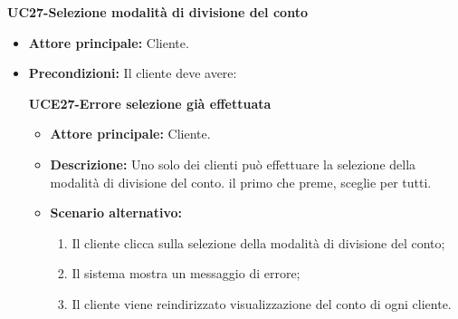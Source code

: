 \textbf{UC27-Selezione modalità di divisione del conto}
\begin{itemize}
\item \textbf{Attore principale:} Cliente.
\item \textbf{Precondizioni:} Il cliente deve avere:

\textbf{UCE27-Errore selezione già effettuata}
\begin{itemize}
\item \textbf{Attore principale:} Cliente.
\item \textbf{Descrizione:} Uno solo dei clienti può effettuare la selezione della modalità di divisione del conto.
  il primo che preme, sceglie per tutti.
\item \textbf{Scenario alternativo:}
\begin{enumerate}
    \item Il cliente clicca sulla selezione della modalità di divisione del conto;
    \item Il sistema mostra un messaggio di errore;
    \item Il cliente viene reindirizzato visualizzazione del conto di ogni cliente.
\end{enumerate}
\end{itemize}


\end{itemize}
